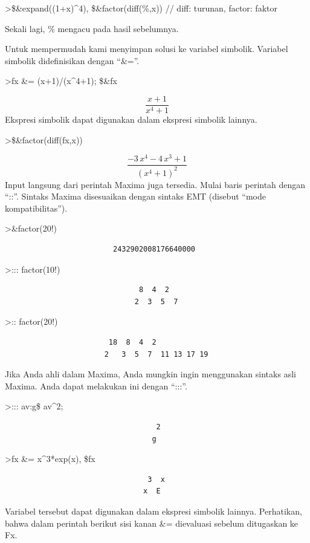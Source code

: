 \documentclass[
]{book}
\begin{document}
\textgreater\$\&expand((1+x)\^{}4), \$\&factor(diff(\%,x)) // diff: turunan, factor: faktor

Sekali lagi, \% mengacu pada hasil sebelumnya.

Untuk mempermudah kami menyimpan solusi ke variabel simbolik. Variabel simbolik didefinisikan dengan ``\&=''.

\textgreater fx \&= (x+1)/(x\^{}4+1); \$\&fx

\[\frac{x+1}{x^4+1}\]Ekspresi simbolik dapat digunakan dalam ekspresi simbolik lainnya.

\textgreater\$\&factor(diff(fx,x))

\[\frac{-3\,x^4-4\,x^3+1}{\left(x^4+1\right)^2}\]Input langsung dari perintah Maxima juga tersedia. Mulai baris perintah dengan ``::''. Sintaks Maxima disesuaikan dengan sintaks EMT (disebut ``mode kompatibilitas'').

\textgreater\&factor(20!)

\begin{verbatim}
                         2432902008176640000
\end{verbatim}

\textgreater::: factor(10!)

\begin{verbatim}
                               8  4  2
                              2  3  5  7
\end{verbatim}

\textgreater:: factor(20!)

\begin{verbatim}
                        18  8  4  2
                       2   3  5  7  11 13 17 19
\end{verbatim}

Jika Anda ahli dalam Maxima, Anda mungkin ingin menggunakan sintaks asli Maxima. Anda dapat melakukan ini dengan ``:::''.

\textgreater::: av:g\$ av\^{}2;

\begin{verbatim}
                                   2
                                  g
\end{verbatim}

\textgreater fx \&= x\^{}3*exp(x), \$fx

\begin{verbatim}
                                 3  x
                                x  E
\end{verbatim}

Variabel tersebut dapat digunakan dalam ekspresi simbolik lainnya. Perhatikan, bahwa dalam perintah berikut sisi kanan \&= dievaluasi sebelum ditugaskan ke Fx.
\end{document}
